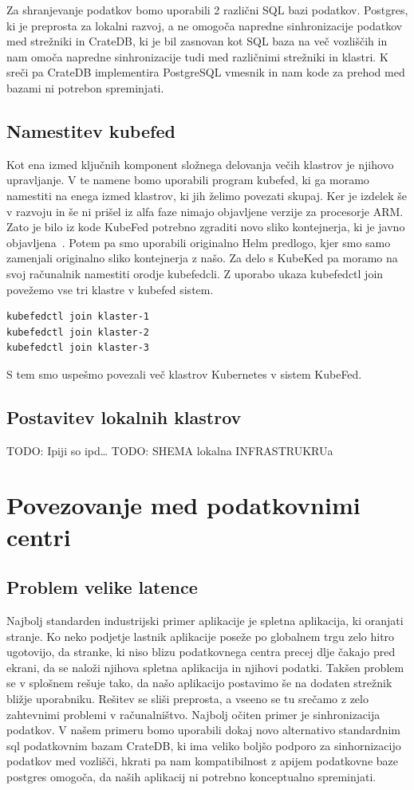 \documentclass[a4paper, 12pt]{book}
\begin{document}
Za shranjevanje podatkov bomo uporabili 2 različni SQL bazi podatkov.
Postgres, ki je preprosta za lokalni razvoj, a ne omogoča napredne sinhronizacije podatkov med strežniki in CrateDB, ki je bil zasnovan kot SQL baza na več vozliščih in nam omoča napredne sinhronizacije tudi med različnimi strežniki in klastri.
K sreči pa CrateDB implementira PostgreSQL vmesnik in nam kode za prehod med bazami ni potrebon spreminjati.
\section{Namestitev kubefed}
Kot ena izmed ključnih komponent složnega delovanja večih klastrov je njihovo upravljanje.
V te namene bomo uporabili program kubefed, ki ga moramo namestiti na enega izmed klastrov, ki jih želimo povezati skupaj.
Ker je izdelek še v razvoju in še ni prišel iz alfa faze nimajo objavljene verzije za procesorje ARM.
Zato je bilo iz kode KubeFed potrebno zgraditi novo sliko kontejnerja, ki je javno objavljena~\cite{https://hub.docker.com/r/hostops/kubefed}.
Potem pa smo uporabili originalno Helm predlogo, kjer smo samo zamenjali originalno sliko kontejnerja z našo.
Za delo s KubeKed pa moramo na svoj računalnik namestiti orodje kubefedcli.
Z uporabo ukaza kubefedctl join povežemo vse tri klastre v kubefed sistem.
\begin{verbatim}
kubefedctl join klaster-1
kubefedctl join klaster-2
kubefedctl join klaster-3
\end{verbatim}
S tem smo uspešmo povezali več klastrov Kubernetes v sistem KubeFed.
\section{Postavitev lokalnih klastrov}
TODO: Ipiji so ipd\dots
TODO: SHEMA lokalna INFRASTRUKRUa
\chapter{Povezovanje med podatkovnimi centri}
\section{Problem velike latence}
Najbolj standarden industrijski primer aplikacije je spletna aplikacija, ki oranjati stranje. 
Ko neko podjetje lastnik aplikacije poseže po globalnem trgu zelo hitro ugotovijo, da stranke, ki niso blizu podatkovnega centra precej dlje čakajo pred ekrani, da se naloži njihova spletna aplikacija in njihovi podatki.
Takšen problem se v splošnem rešuje tako, da našo aplikacijo postavimo še na dodaten strežnik bližje uporabniku. 
Rešitev se sliši preprosta, a vseeno se tu srečamo z zelo zahtevnimi problemi v
računalništvo. Najbolj očiten primer je sinhronizacija podatkov.
V našem primeru bomo uporabili dokaj novo alternativo standardnim sql podatkovnim bazam CrateDB, ki ima veliko boljšo podporo za sinhornizacijo podatkov med vozlišči, hkrati pa nam kompatibilnost z apijem podatkovne baze postgres omogoča, da naših aplikacij ni potrebno konceptualno spreminjati.
\end{document}
